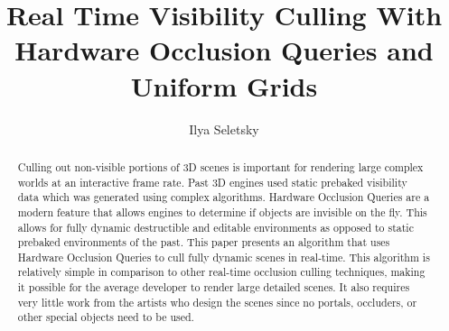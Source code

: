 \documentclass[12pt]{ucthesis}
\begin{document}

\title{Real Time Visibility Culling With Hardware Occlusion Queries and Uniform Grids}
\author{Ilya Seletsky}
  
 
     

\maketitle

\begin{frontmatter}

\copyrightpage

\committeemembershippage

\begin{abstract}

Culling out non-visible portions of 3D scenes is important for rendering large complex worlds at an interactive frame rate.
Past 3D engines used static prebaked visibility data which was generated using complex algorithms.
Hardware Occlusion Queries are a modern feature that allows engines to determine if objects are invisible on the fly.
This allows for fully dynamic destructible and editable environments as opposed to static prebaked environments of the past.
This paper presents an algorithm that uses Hardware Occlusion Queries to cull fully dynamic scenes in real-time.
This algorithm is relatively simple in comparison to other real-time occlusion culling techniques, making it possible for the average developer to render large detailed scenes.
It also requires very little work from the artists who design the scenes since no portals, occluders, or other special objects need to be used.

\end{abstract}





\tableofcontents


\listoftables

\listoffigures

\end{frontmatter}
\end{document}
